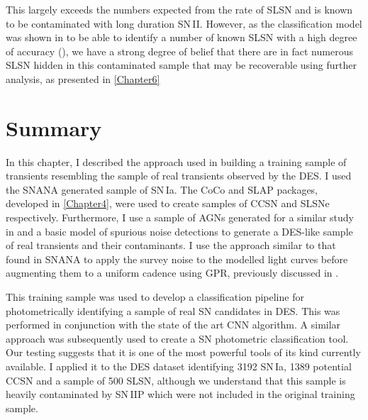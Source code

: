 This largely exceeds the numbers expected from the rate of SLSN and is known to be contaminated with long duration SN\,II. However, as the classification model was shown in  to be able to identify a number of known SLSN with a high degree of accuracy (), we have a strong degree of belief that there are in fact numerous SLSN hidden in this contaminated sample that may be recoverable using further analysis, as presented in \cref{Chapter6}

\section{Summary}
In this chapter, I described the approach used in building a training sample of transients resembling the sample of real transients observed by the DES. I used the SNANA generated sample of SN\,Ia. The CoCo and SLAP packages, developed in \cref{Chapter4}, were used to create samples of CCSN and SLSNe respectively. Furthermore, I use a sample of AGNs generated for a similar study in \citet{Hoenig2014} and a basic model of spurious noise detections to generate a DES-like sample of real transients and their contaminants. I use the approach similar to that found in SNANA to apply the survey noise to the modelled light curves before augmenting them to a uniform cadence using GPR, previously discussed in .

This training sample was used to develop a classification pipeline for photometrically identifying a sample of real SN candidates in DES. This was performed in conjunction with the state of the art CNN algorithm. A similar approach was subsequently used to create a SN photometric classification tool. Our testing suggests that it is one of the most powerful tools of its kind currently available. I applied it to the DES dataset identifying 3192 SN\,Ia, 1389 potential CCSN and a sample of 500 SLSN, although we understand that this sample is heavily contaminated by SN\,IIP which were not included in the original training sample.
